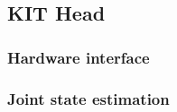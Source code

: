\subsection{KIT Head}
\label{sec:kithead}

\subsubsection{Hardware interface}

\subsubsection{Joint state estimation}
